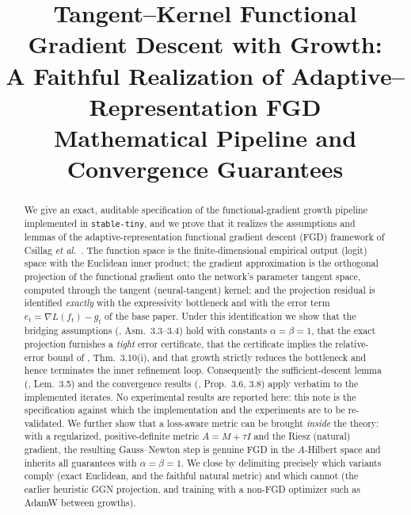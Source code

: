 \documentclass[conference]{IEEEtran}
\theoremstyle{remark}
\newcommand{\grad}{\nabla}
\begin{document}
\title{Tangent--Kernel Functional Gradient Descent with Growth:\\
A Faithful Realization of Adaptive--Representation FGD\\
\large Mathematical Pipeline and Convergence Guarantees}

\author{}

\maketitle

\begin{abstract}
We give an exact, auditable specification of the functional-gradient growth
pipeline implemented in \texttt{stable-tiny}, and we prove that it realizes the
assumptions and lemmas of the adaptive-representation functional gradient descent
(FGD) framework of Csillag \emph{et al.}~\cite{fgd}. The function space is the
finite-dimensional empirical output (logit) space with the Euclidean inner
product; the gradient approximation is the orthogonal projection of the functional
gradient onto the network's parameter tangent space, computed through the tangent
(neural-tangent) kernel; and the projection residual is identified \emph{exactly}
with the expressivity bottleneck and with the error term $e_t=\grad L(f_t)-g_t$ of
the base paper. Under this identification we show that the bridging assumptions
(\cite{fgd}, Asm.~3.3--3.4) hold with constants $\alpha=\beta=1$, that the exact
projection furnishes a \emph{tight} error certificate, that the certificate
implies the relative-error bound of \cite{fgd}, Thm.~3.10(i), and that growth
strictly reduces the bottleneck and hence terminates the inner refinement loop.
Consequently the sufficient-descent lemma (\cite{fgd}, Lem.~3.5) and the
convergence results (\cite{fgd}, Prop.~3.6, 3.8) apply verbatim to the implemented
iterates. No experimental results are reported here: this note is the
specification against which the implementation and the experiments are to be
re-validated. We further show that a loss-aware metric can be brought \emph{inside}
the theory: with a regularized, positive-definite metric $A=M+\tau I$ and the
Riesz (natural) gradient, the resulting Gauss--Newton step is genuine FGD in the
$A$-Hilbert space and inherits all guarantees with $\alpha=\beta=1$. We close by
delimiting precisely which variants comply (exact Euclidean, and the faithful
natural metric) and which cannot (the earlier heuristic GGN projection, and
training with a non-FGD optimizer such as AdamW between growths).
\end{abstract}
\end{document}
